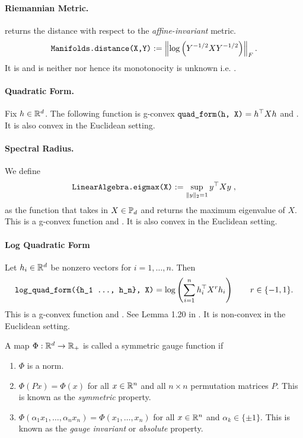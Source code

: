 \documentclass[twoside,11pt]{article}
\begin{document}
\paragraph{Riemannian Metric.}
 returns the distance with respect to the \textit{affine-invariant} metric. 
\[
\texttt{Manifolds.distance(X,Y)} := \left\|\log \left(Y^{-1/2}X Y^{-1/2}\right)\right\|_F.
\] 
It is  and is neither  nor  hence its monotonocity is unknown i.e. .

\paragraph{Quadratic Form.}
Fix $h \in \mathbb{R}^d$. The following function is g-convex $\texttt{quad\_form(h, X)} = h^\top X h$ and . It is also convex in the Euclidean setting. 


\paragraph{Spectral Radius.} We define
\[\texttt{LinearAlgebra.eigmax(X)} := \sup_{\|y\|_2 = 1}y^\top X y  \; ,\]
as the function that takes in $X \in \mathbb{P}_d$ and returns the maximum eigenvalue of $X$. This is a g-convex function and . It is also convex in the Euclidean setting.


\paragraph{Log Quadratic Form}

 Let $h_i \in \mathbb{R}^d$ be nonzero vectors for $i = 1, \ldots, n$. Then  
\[
\texttt{log\_quad\_form(\{h\_1 \ldots, h\_n\}, X)} = \log \left(\sum_{i=1}^n h_i^\top X^{r} h_i \right) \qquad r \in \{-1, 1\}.
\]
This is a g-convex function and . See Lemma 1.20 in \citep{wieselstructuredcovariance}. It is non-convex in the Euclidean setting.


\begin{definition} 
     A map $\Phi:\mathbb{R}^d \to \mathbb{R}_+$ is called a symmetric gauge function if 
    \begin{enumerate}
        \item $\Phi$ is a norm.
        \item $\Phi(Px) = \Phi(x)$ for all $x \in \mathbb{R}^n$ and all $n\times n$ permutation matrices $P$. This is known as the \textit{symmetric} property.
        \item $\Phi(\alpha_1 x_1, \ldots, \alpha_n x_n) = \Phi(x_1, \ldots, x_n)$ for all $x \in \mathbb{R}^n$ and $\alpha_k \in \{\pm 1\}$. This is known as the \textit{gauge invariant} or \textit{absolute} property.
    \end{enumerate}
\end{definition}
\end{document}
